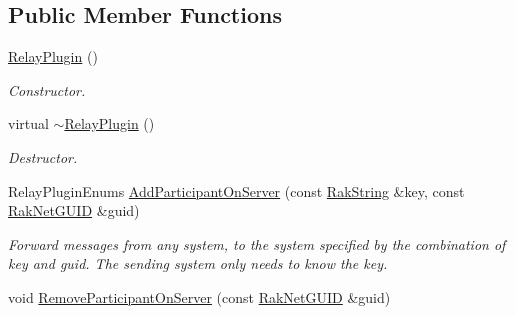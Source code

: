 \subsection*{Public Member Functions}
\begin{DoxyCompactItemize}
\item 
\hypertarget{class_rak_net_1_1_relay_plugin_a41fa4280b42747c253e71e46b2a8155e}{\hyperlink{class_rak_net_1_1_relay_plugin_a41fa4280b42747c253e71e46b2a8155e}{Relay\-Plugin} ()}\label{class_rak_net_1_1_relay_plugin_a41fa4280b42747c253e71e46b2a8155e}

\begin{DoxyCompactList}\small\item\em Constructor. \end{DoxyCompactList}\item 
\hypertarget{class_rak_net_1_1_relay_plugin_ad6c129d0be47d82443245a9c32a6ddd8}{virtual \hyperlink{class_rak_net_1_1_relay_plugin_ad6c129d0be47d82443245a9c32a6ddd8}{$\sim$\-Relay\-Plugin} ()}\label{class_rak_net_1_1_relay_plugin_ad6c129d0be47d82443245a9c32a6ddd8}

\begin{DoxyCompactList}\small\item\em Destructor. \end{DoxyCompactList}\item 
Relay\-Plugin\-Enums \hyperlink{class_rak_net_1_1_relay_plugin_a8a8b10be11428da1b26e0f9a9e1e133e}{Add\-Participant\-On\-Server} (const \hyperlink{class_rak_net_1_1_rak_string}{Rak\-String} \&key, const \hyperlink{struct_rak_net_1_1_rak_net_g_u_i_d}{Rak\-Net\-G\-U\-I\-D} \&guid)
\begin{DoxyCompactList}\small\item\em Forward messages from any system, to the system specified by the combination of key and guid. The sending system only needs to know the key. \end{DoxyCompactList}\item 
\hypertarget{class_rak_net_1_1_relay_plugin_a0488ca3755034a74ad4275263a3fb0dc}{void \hyperlink{class_rak_net_1_1_relay_plugin_a0488ca3755034a74ad4275263a3fb0dc}{Remove\-Participant\-On\-Server} (const \hyperlink{struct_rak_net_1_1_rak_net_g_u_i_d}{Rak\-Net\-G\-U\-I\-D} \&guid)}\label{class_rak_net_1_1_relay_plugin_a0488ca3755034a74ad4275263a3fb0dc}


\end{DoxyCompactItemize}
